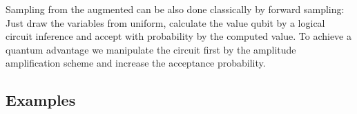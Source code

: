 Sampling from the augmented \ComputationActivationNetwork{} can be also done classically by forward sampling:
Just draw the variables from uniform, calculate the value qubit by a logical circuit inference and accept with probability by the computed value.
To achieve a quantum advantage we manipulate the circuit first by the amplitude amplification scheme and increase the acceptance probability.

\subsection{Examples}







